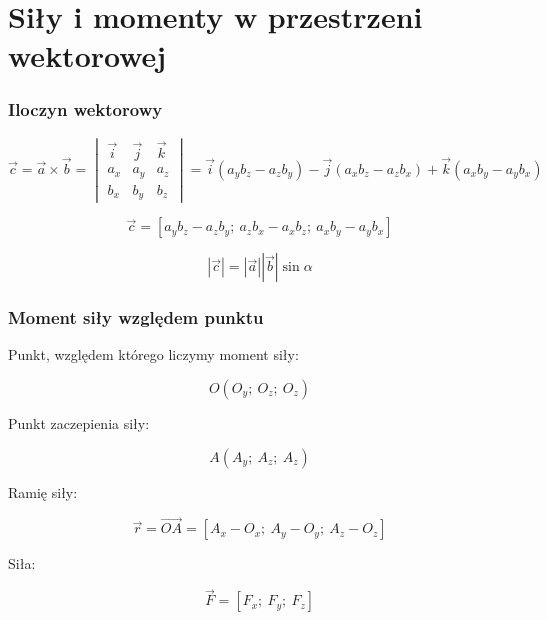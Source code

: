 \section{Siły i momenty w przestrzeni wektorowej}

\subsubsection*{Iloczyn wektorowy}

\begin{equation}
    \Vec{c} = \Vec{a} \times \Vec{b} = \begin{vmatrix}
    \Vec{i} & \Vec{j} & \Vec{k} \\
    a_x & a_y & a_z \\
    b_x & b_y & b_z
    \end{vmatrix}  = \Vec{i}(a_y b_z - a_z b_y) - \Vec{j}(a_x b_z - a_z b_x) + \Vec{k}(a_x b_y - a_y b_x)
\end{equation}

\begin{equation}
    \Vec{c} = [a_y b_z - a_z b_y;\ a_z b_x - a_x b_z;\ a_x b_y - a_y b_x]
\end{equation}

\begin{equation}
    |\Vec{c}| = |\Vec{a}| |\Vec{b}| \sin\alpha
\end{equation}

\subsubsection*{Moment siły względem punktu}

Punkt, względem którego liczymy moment siły:

\begin{equation*}
    O(O_y;\ O_z;\ O_z)
\end{equation*}

Punkt zaczepienia siły:

\begin{equation*}
    A(A_y;\ A_z;\ A_z)
\end{equation*}

Ramię siły:

\begin{equation}
    \Vec{r} = \Vec{OA} = [A_x - O_x;\ A_y - O_y;\ A_z - O_z]
\end{equation}

Siła:

\begin{equation*}
    \Vec{F} = [F_x;\ F_y;\ F_z]
\end{equation*}

